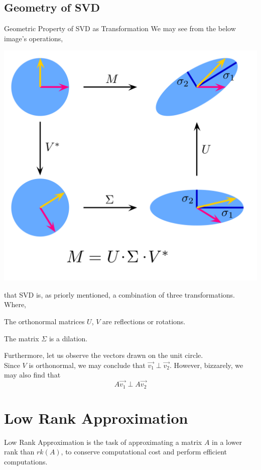 \subsection{Geometry of SVD}
\begin{ln-fig}{Geometric Property of SVD as Transformation}{}
    We may see from the below image's operations,
    \begin{center}
        \includegraphics[scale=0.1]{figs/ln05/svd_geometry.png}
    \end{center}
    that SVD is, as priorly mentioned, a combination of three transformations. Where,
    \begin{bindenum}
        \item The orthonormal matrices $U$, $V$ are reflections or rotations.
        \item The matrix $\Sigma$ is a dilation.
    \end{bindenum}
    Furthermore, let us observe the vectors drawn on the unit circle. \\
    Since $V$ is orthonormal, we may conclude that $\vec{v_1} \perp \vec{v_2}$. However, bizzarely, we may also find that
    \[A \vec{v_1} \perp A \vec{v_2}\]
\end{ln-fig}

\section{Low Rank Approximation}
Low Rank Approximation is the task of approximating a matrix $A$ in a lower rank than $rk(A)$, to conserve computational cost and perform efficient computations.

